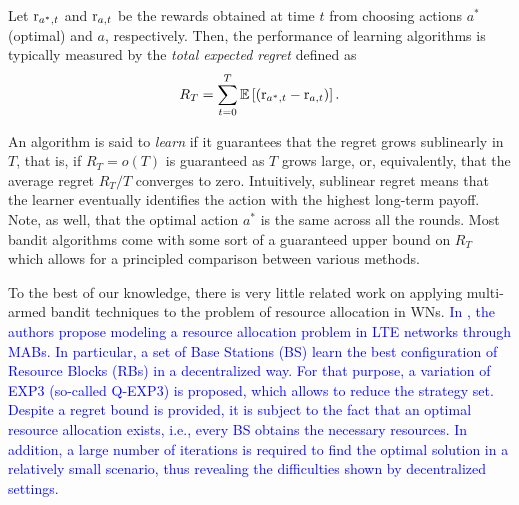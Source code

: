 \documentclass[preprint,12pt]{elsarticle}
\newcommand{\francesc}[1]{\textcolor{blue}{#1}}
\begin{document}
Let ${\rm r}_{a^*,t}$ and ${\rm r}_{a,t}$ be the rewards obtained at time $t$ from choosing actions $a^*$ (optimal) and $a$, respectively. Then, the performance of learning algorithms is typically measured by the \emph{total expected regret} defined as  \[R_T = \sum_{t=0}^{T} \mathbb{E}\left[\left({\rm r}_{a^*,t} - {\rm r}_{a,t}\right)\right].\]

An algorithm is said to \emph{learn} if it guarantees that the regret grows sublinearly in $T$, that is, if $R_T = o(T)$ is guaranteed as $T$ grows large, or, equivalently, that the average regret $R_T/T$ converges to zero. Intuitively, sublinear regret means that the learner eventually identifies the action with the highest long-term payoff. Note, as well, that the optimal action $a^*$ is the same across all the rounds. Most bandit algorithms come with some sort of a guaranteed upper bound on $R_T$ which allows for a principled comparison between various methods. 

To the best of our knowledge, there is very little related work on applying multi-armed bandit techniques to the problem of resource allocation in WNs. \francesc{In \cite{coucheney2015multi}, the authors propose modeling a resource allocation problem in LTE networks through MABs. In particular, a set of Base Stations (BS) learn the best configuration of Resource Blocks (RBs) in a decentralized way. For that purpose, a variation of EXP3 (so-called Q-EXP3) is proposed, which allows to reduce the strategy set. Despite a regret bound is provided, it is subject to the fact that an optimal resource allocation exists, i.e., every BS obtains the necessary resources. In addition, a large number of iterations is required to find the optimal solution in a relatively small scenario, thus revealing the difficulties shown by decentralized settings.}
\end{document}
